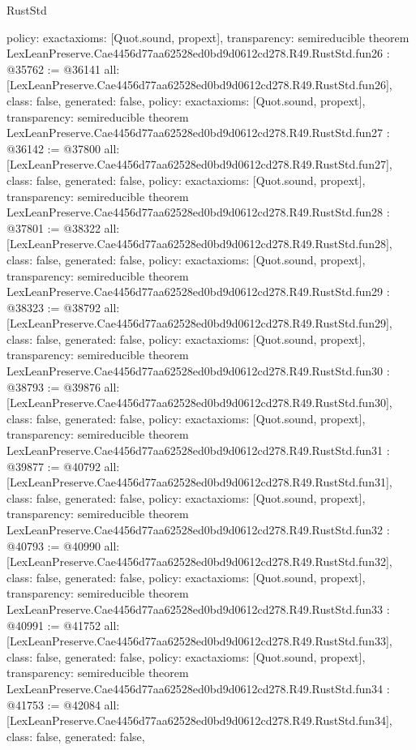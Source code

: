 \begin{lexlean}{RustStd}
\begin{coremodule}
{  policy: exact{axioms: [Quot.sound, propext]},
  transparency: semireducible
}
theorem LexLeanPreserve.Cae4456d77aa62528ed0bd9d0612cd278.R49.RustStd.fun26 : @35762 := @36141 {
  all: [LexLeanPreserve.Cae4456d77aa62528ed0bd9d0612cd278.R49.RustStd.fun26],
  class: false,
  generated: false,
  policy: exact{axioms: [Quot.sound, propext]},
  transparency: semireducible
}
theorem LexLeanPreserve.Cae4456d77aa62528ed0bd9d0612cd278.R49.RustStd.fun27 : @36142 := @37800 {
  all: [LexLeanPreserve.Cae4456d77aa62528ed0bd9d0612cd278.R49.RustStd.fun27],
  class: false,
  generated: false,
  policy: exact{axioms: [Quot.sound, propext]},
  transparency: semireducible
}
theorem LexLeanPreserve.Cae4456d77aa62528ed0bd9d0612cd278.R49.RustStd.fun28 : @37801 := @38322 {
  all: [LexLeanPreserve.Cae4456d77aa62528ed0bd9d0612cd278.R49.RustStd.fun28],
  class: false,
  generated: false,
  policy: exact{axioms: [Quot.sound, propext]},
  transparency: semireducible
}
theorem LexLeanPreserve.Cae4456d77aa62528ed0bd9d0612cd278.R49.RustStd.fun29 : @38323 := @38792 {
  all: [LexLeanPreserve.Cae4456d77aa62528ed0bd9d0612cd278.R49.RustStd.fun29],
  class: false,
  generated: false,
  policy: exact{axioms: [Quot.sound, propext]},
  transparency: semireducible
}
theorem LexLeanPreserve.Cae4456d77aa62528ed0bd9d0612cd278.R49.RustStd.fun30 : @38793 := @39876 {
  all: [LexLeanPreserve.Cae4456d77aa62528ed0bd9d0612cd278.R49.RustStd.fun30],
  class: false,
  generated: false,
  policy: exact{axioms: [Quot.sound, propext]},
  transparency: semireducible
}
theorem LexLeanPreserve.Cae4456d77aa62528ed0bd9d0612cd278.R49.RustStd.fun31 : @39877 := @40792 {
  all: [LexLeanPreserve.Cae4456d77aa62528ed0bd9d0612cd278.R49.RustStd.fun31],
  class: false,
  generated: false,
  policy: exact{axioms: [Quot.sound, propext]},
  transparency: semireducible
}
theorem LexLeanPreserve.Cae4456d77aa62528ed0bd9d0612cd278.R49.RustStd.fun32 : @40793 := @40990 {
  all: [LexLeanPreserve.Cae4456d77aa62528ed0bd9d0612cd278.R49.RustStd.fun32],
  class: false,
  generated: false,
  policy: exact{axioms: [Quot.sound, propext]},
  transparency: semireducible
}
theorem LexLeanPreserve.Cae4456d77aa62528ed0bd9d0612cd278.R49.RustStd.fun33 : @40991 := @41752 {
  all: [LexLeanPreserve.Cae4456d77aa62528ed0bd9d0612cd278.R49.RustStd.fun33],
  class: false,
  generated: false,
  policy: exact{axioms: [Quot.sound, propext]},
  transparency: semireducible
}
theorem LexLeanPreserve.Cae4456d77aa62528ed0bd9d0612cd278.R49.RustStd.fun34 : @41753 := @42084 {
  all: [LexLeanPreserve.Cae4456d77aa62528ed0bd9d0612cd278.R49.RustStd.fun34],
  class: false,
  generated: false,
}
\end{coremodule}
\end{lexlean}
